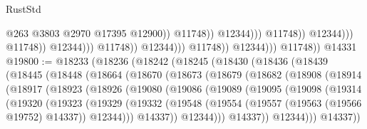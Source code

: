 \begin{lexlean}{RustStd}
\begin{coremodule}
{\begin{coremodule}
{{{{{{{{{{{{{{{{{{{{{{{{{{{{{                                                              @263
                                                              @3803
                                                              @2970
                                                              @17395
                                                              @12900))
                                                          @11748))
                                                      @12344)))
                                                @11748))
                                            @12344)))
                                      @11748))
                                  @12344)))
                            @11748))
                        @12344)))
                  @11748))
              @12344)))
        @11748))
    @14331
@19800 := @18233
    (@18236
      (@18242
        (@18245
          (@18430
            (@18436
              (@18439
                (@18445
                  (@18448
                    (@18664
                      (@18670
                        (@18673
                          (@18679
                            (@18682
                              (@18908
                                (@18914
                                  (@18917
                                    (@18923
                                      (@18926
                                        (@19080
                                          (@19086
                                            (@19089
                                              (@19095
                                                (@19098
                                                  (@19314
                                                    (@19320
                                                      (@19323
                                                        (@19329
                                                          (@19332
                                                            (@19548
                                                              (@19554
                                                                (@19557
                                                                  (@19563 (@19566 @19752) @14337))
                                                                @12344)))
                                                          @14337))
                                                      @12344)))
                                                @14337))
                                            @12344)))
                                      @14337))
}}}}}}}}}}}}}}}}}}}}}}}}}}}}}
\end{coremodule}}
\end{coremodule}
\end{lexlean}
